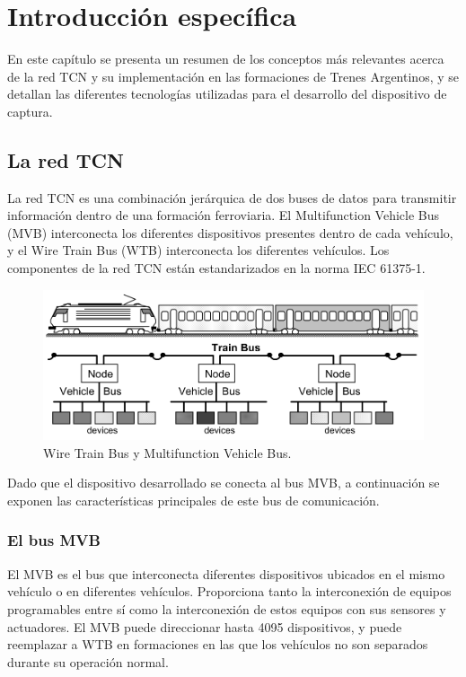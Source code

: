 \chapter{Introducción específica}

En este capítulo se presenta un resumen de los conceptos más relevantes acerca de la red TCN y su implementación en las formaciones de Trenes Argentinos, y se detallan las diferentes tecnologías utilizadas para el desarrollo del dispositivo de captura.

\section{La red TCN}

La red TCN es una combinación jerárquica de dos buses de datos para transmitir información dentro de una formación ferroviaria. El Multifunction Vehicle Bus (MVB) interconecta los diferentes dispositivos presentes dentro de cada vehículo, y el Wire Train Bus (WTB) interconecta los diferentes vehículos. Los componentes de la red TCN están estandarizados en la norma IEC 61375-1.

\begin{figure}[htbp]
	\centering
	\includegraphics[width=.8\textwidth]{./Figures/tcn-mvb-wtb.png}
	\caption[Wire Train Bus y Multifunction Vehicle Bus]{Wire Train Bus y Multifunction Vehicle Bus.
        \\ }
\end{figure}

Dado que el dispositivo desarrollado se conecta al bus MVB, a continuación se exponen las características principales de este bus de comunicación.

\subsection{El bus MVB}

El MVB es el bus que interconecta diferentes dispositivos ubicados en el mismo vehículo o en diferentes vehículos. Proporciona tanto la interconexión de equipos programables entre sí como la interconexión de estos equipos con sus sensores y actuadores. El MVB puede direccionar hasta 4095 dispositivos, y puede reemplazar a WTB en formaciones en las que los vehículos no son separados durante su operación normal.

